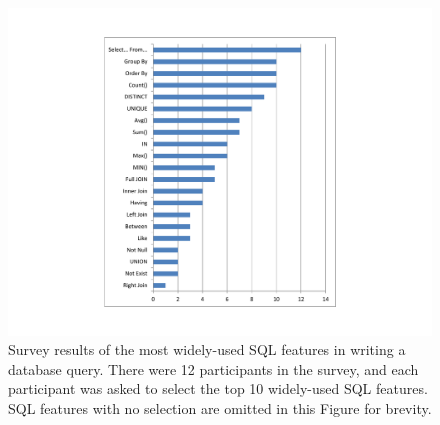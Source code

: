 
\begin{figure}[t]
  \centering
  \includegraphics[scale=0.50]{survey}
  \vspace*{-1.0ex}\caption {{\label{fig:survey}
  Survey results of the most widely-used SQL features
  in writing a database query. There were 12 participants
  in the survey, and each participant was asked to
  select the top 10 widely-used SQL features.
  SQL features with no selection are omitted in this Figure
  for brevity.
}}

\end{figure}

\newcommand{\q}{\langle query\rangle}
\newcommand{\db}{\langle db\rangle}
\newcommand{\pat}{\langle pat\rangle}
\newcommand{\bug}{\langle bug\rangle}
\newcommand{\dist}{\langle distance\rangle}
\newcommand{\sem}[1]{\llbracket #1\rrbracket}
\newcommand{\lit}[1]{\texttt{#1}}

\newcommand{\column}{\langle column\rangle}
\newcommand{\dbtable}{\langle table\rangle}
\newcommand{\cond}{\langle cond\rangle}
\newcommand{\op}{\langle op\rangle}
\newcommand{\e}{\langle expr\rangle}
\newcommand{\ce}{\langle cexpr\rangle}

